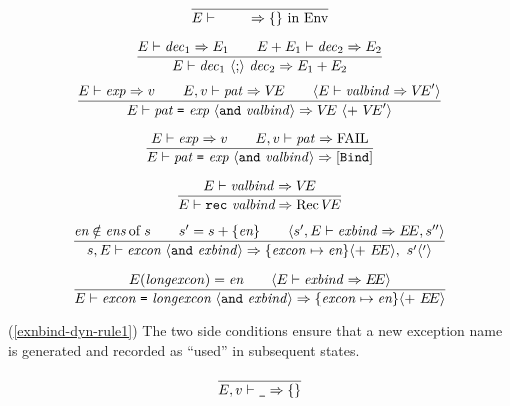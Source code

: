 \vspace{6pt}
\begin{equation}	%
\frac{}
     {\E\ts\emptydec\ra\emptymap\ \In\ \Env}
\end{equation}

\begin{equation}	%
\frac{\E\ts\dec_1\ra\E_1\qquad\E+\E_1\ts\dec_2\ra\E_2}
     {\E\ts\seqdec\ra\plusmap{E_1}{E_2}}
\end{equation}
%
%
\begin{equation}	%
\frac{\E\ts\exp\ra\V\qquad\E,\V\ts\pat\ra\VE\qquad
      \langle\E\ts\valbind\ra\VE'\rangle }
     {\E\ts\longvalbind\ra\VE\ \langle +\ \VE'\rangle}\index{55.1}
\end{equation}

\begin{equation}	%
\frac{\E\ts\exp\ra\V\qquad\E,\V\ts\pat\ra\FAIL}
     {\E\ts\longvalbind\ra[\ml{Bind}]}
\end{equation}

\begin{equation}	%
\frac{\E\ts\valbind\ra\VE}
     {\E\ts\recvalbind\ra\Rec\VE}
\end{equation}

\begin{equation}	%
\label{exnbind-dyn-rule1}
\frac{\e\notin\of{\excs}{\s}\qquad\s'=\s+\{\e\}\qquad
      \langle\s',\E\ts\exnbind\ra\EE,\s''\rangle }
     {\s,\E\ts\longexnbindaa\ra\{\exn\mapsto\e\}\langle +\ \EE\rangle,\
                               \s'\langle'\rangle}\index{55.2}
\end{equation}

\begin{equation}	%
\frac{\E(\longexn)=\e\qquad
      \langle\E\ts\exnbind\ra\EE\rangle }
     {\E\ts\longexnbindb\ra\{\exn\mapsto\e\}\langle +\ \EE\rangle}
\end{equation}
\comments
\begin{description}
\item{(\ref{exnbind-dyn-rule1})}
  The two side conditions ensure that a new exception name is generated and 
recorded as ``used'' in subsequent states.
\end{description}
%
%
\begin{equation}	%
\frac{}
     {\E,\V\ts\wildpat\ra \emptymap}\index{55.3}
\end{equation}

